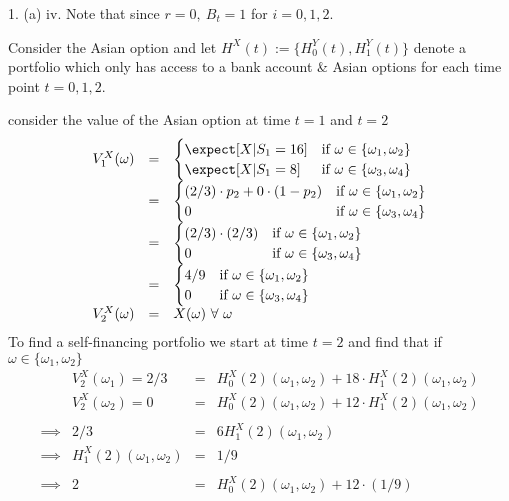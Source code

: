 \documentclass[11pt,a4paper]{article}
\begin{document}
\begin{answer}{1. (a) iv.}
  Note that since $r=0,\ B_t=1$ for $i=0,1,2$.
  \par Consider the Asian option and let $H^X(t):=\{H_0^Y(t),H_1^Y(t)\}$ denote a portfolio which only has access to a bank account \& Asian options for each time point $t=0,1,2$.
  \par consider the value of the Asian option at time $t=1$ and $t=2$
  \[\begin{array}{rcl}
    V_1^X(\omega)&=&\begin{cases}
      \expect[X|S_1=16]&\text{if }\omega\in\{\omega_1,\omega_2\}\\
      \expect[X|S_1=8]&\text{if }\omega\in\{\omega_3,\omega_4\}
    \end{cases}\\
    &=&\begin{cases}
      (2/3)\cdot p_2+0\cdot(1-p_2)&\text{if }\omega\in\{\omega_1,\omega_2\}\\
      0&\text{if }\omega\in\{\omega_3,\omega_4\}
    \end{cases}\\
    &=&\begin{cases}
      (2/3)\cdot(2/3)&\text{if }\omega\in\{\omega_1,\omega_2\}\\
      0&\text{if }\omega\in\{\omega_3,\omega_4\}
    \end{cases}\\
    &=&\begin{cases}
      4/9&\text{if }\omega\in\{\omega_1,\omega_2\}\\
      0&\text{if }\omega\in\{\omega_3,\omega_4\}
    \end{cases}\\
    V_2^X(\omega)&=&X(\omega)\ \forall\ \omega
  \end{array}\]
  To find a self-financing portfolio we start at time $t=2$ and find that if $\omega\in\{\omega_1,\omega_2\}$
  \[\begin{array}{rrcl}
    &V_2^X(\omega_1)=2/3&=&H_0^X(2)(\omega_1,\omega_2)+18\cdot H_1^X(2)(\omega_1,\omega_2)\\
    &V_2^X(\omega_2)=0&=&H_0^X(2)(\omega_1,\omega_2)+12\cdot H_1^X(2)(\omega_1,\omega_2)\\\\
    \implies&2/3&=&6H_1^X(2)(\omega_1,\omega_2)\\
    \implies&H_1^X(2)(\omega_1,\omega_2)&=&1/9\\\\
    \implies&2&=&H_0^X(2)(\omega_1,\omega_2)+12\cdot(1/9)\\

\end{array}\]
\end{answer}
\end{document}
